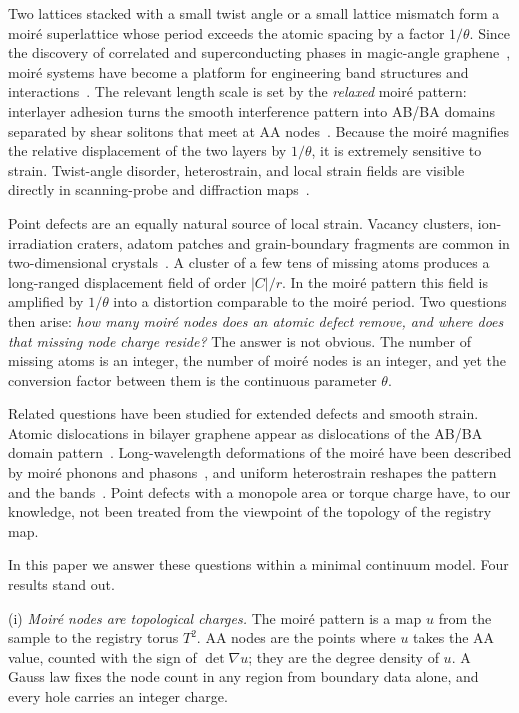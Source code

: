 \documentclass[prb,twocolumn,superscriptaddress,floatfix,10pt]{revtex4-2}
\begin{document}
Two lattices stacked with a small twist angle or a small lattice mismatch form a moir\'e superlattice whose period exceeds the atomic spacing by a factor $1/\theta$. Since the discovery of correlated and superconducting phases in magic-angle graphene~\cite{Bistritzer2011,Cao2018a,Cao2018b}, moir\'e systems have become a platform for engineering band structures and interactions~\cite{Andrei2020,Kennes2021}. The relevant length scale is set by the \emph{relaxed} moir\'e pattern: interlayer adhesion turns the smooth interference pattern into AB/BA domains separated by shear solitons that meet at AA nodes~\cite{Popov2011,Alden2013,Nam2017,Carr2018,Yoo2019,Dai2016,Gargiulo2018,Zhang2018}. Because the moir\'e magnifies the relative displacement of the two layers by $1/\theta$, it is extremely sensitive to strain. Twist-angle disorder, heterostrain, and local strain fields are visible directly in scanning-probe and diffraction maps~\cite{Uri2020,Kerelsky2019,Huder2018,Kazmierczak2021,Halbertal2021,Lau2022}.

Point defects are an equally natural source of local strain. Vacancy clusters, ion-irradiation craters, adatom patches and grain-boundary fragments are common in two-dimensional crystals~\cite{Banhart2011}. A cluster of a few tens of missing atoms produces a long-ranged displacement field of order $|C|/r$. In the moir\'e pattern this field is amplified by $1/\theta$ into a distortion comparable to the moir\'e period. Two questions then arise: \emph{how many moir\'e nodes does an atomic defect remove, and where does that missing node charge reside?} The answer is not obvious. The number of missing atoms is an integer, the number of moir\'e nodes is an integer, and yet the conversion factor between them is the continuous parameter $\theta$.

Related questions have been studied for extended defects and smooth strain. Atomic dislocations in bilayer graphene appear as dislocations of the AB/BA domain pattern~\cite{Alden2013,Butz2014}. Long-wavelength deformations of the moir\'e have been described by moir\'e phonons and phasons~\cite{KoshinoSon2019,Ochoa2022}, and uniform heterostrain reshapes the pattern and the bands~\cite{Huder2018,Bi2019,Kerelsky2019}. Point defects with a monopole area or torque charge have, to our knowledge, not been treated from the viewpoint of the topology of the registry map.

In this paper we answer these questions within a minimal continuum model. Four results stand out.

(i) \emph{Moir\'e nodes are topological charges.} The moir\'e pattern is a map $u$ from the sample to the registry torus $T^2$. AA nodes are the points where $u$ takes the AA value, counted with the sign of $\det\nabla u$; they are the degree density of $u$. A Gauss law fixes the node count in any region from boundary data alone, and every hole carries an integer charge.
\end{document}
